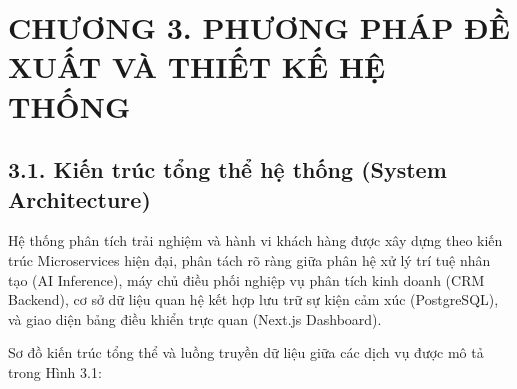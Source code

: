 \section*{CHƯƠNG 3. PHƯƠNG PHÁP ĐỀ XUẤT VÀ THIẾT KẾ HỆ THỐNG}
\setcounter{section}{3}
\setcounter{subsection}{0}
\setcounter{figure}{0}
\setcounter{table}{0}

\subsection*{3.1. Kiến trúc tổng thể hệ thống (System Architecture)}

Hệ thống phân tích trải nghiệm và hành vi khách hàng được xây dựng theo kiến trúc Microservices hiện đại, phân tách rõ ràng giữa phân hệ xử lý trí tuệ nhân tạo (AI Inference), máy chủ điều phối nghiệp vụ phân tích kinh doanh (CRM Backend), cơ sở dữ liệu quan hệ kết hợp lưu trữ sự kiện cảm xúc (PostgreSQL), và giao diện bảng điều khiển trực quan (Next.js Dashboard).

Sơ đồ kiến trúc tổng thể và luồng truyền dữ liệu giữa các dịch vụ được mô tả trong Hình 3.1:

